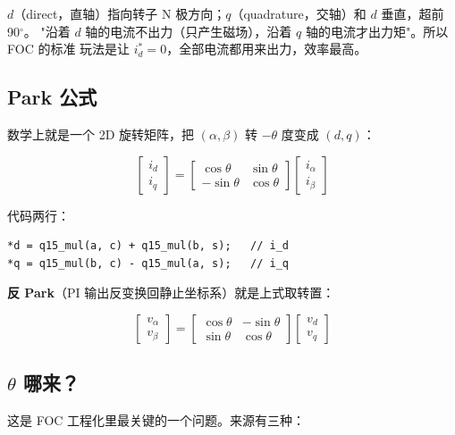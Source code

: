 \documentclass[UTF8,a4paper,11pt]{ctexart}
\begin{document}
\begin{intuition}
$d$（direct，直轴）指向转子 N 极方向；$q$（quadrature，交轴）和 $d$ 垂直，超前 90$^\circ$。
"沿着 $d$ 轴的电流不出力（只产生磁场），沿着 $q$ 轴的电流才出力矩"。所以 FOC 的标准
玩法是让 $i_d^* = 0$，全部电流都用来出力，效率最高。
\end{intuition}

\subsection{Park 公式}

数学上就是一个 2D 旋转矩阵，把 $(\alpha,\beta)$ 转 $-\theta$ 度变成 $(d,q)$：

\[
  \begin{bmatrix} i_d \\ i_q \end{bmatrix}
  =
  \begin{bmatrix} \cos\theta & \sin\theta \\ -\sin\theta & \cos\theta \end{bmatrix}
  \begin{bmatrix} i_\alpha \\ i_\beta \end{bmatrix}
\]

代码两行：

\begin{lstlisting}
*d = q15_mul(a, c) + q15_mul(b, s);   // i_d
*q = q15_mul(b, c) - q15_mul(a, s);   // i_q
\end{lstlisting}

\textbf{反 Park}（PI 输出反变换回静止坐标系）就是上式取转置：

\[
  \begin{bmatrix} v_\alpha \\ v_\beta \end{bmatrix}
  =
  \begin{bmatrix} \cos\theta & -\sin\theta \\ \sin\theta & \cos\theta \end{bmatrix}
  \begin{bmatrix} v_d \\ v_q \end{bmatrix}
\]

\subsection{$\theta$ 哪来？}

这是 FOC 工程化里最关键的一个问题。来源有三种：
\end{document}
